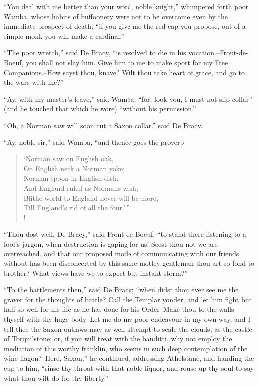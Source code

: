 ``You deal with me better than your word, noble knight,'' whimpered
forth poor Wamba, whose habits of buffoonery were not to be overcome
even by the immediate prospect of death; ``if you give me the red cap
you propose, out of a simple monk you will make a cardinal.''

``The poor wretch,'' said De Bracy, ``is resolved to die in his
vocation.--Front-de-Boeuf, you shall not slay him. Give him to me to
make sport for my Free Companions.--How sayst thou, knave? Wilt thou
take heart of grace, and go to the wars with me?''

``Ay, with my master's leave,'' said Wamba; ``for, look you, I must not
slip collar'' (and he touched that which he wore) ``without his
permission.''

``Oh, a Norman saw will soon cut a Saxon collar.'' said De Bracy.

``Ay, noble sir,'' said Wamba, ``and thence goes the proverb--

\begin{verse}
`Norman saw on English oak,\\
On English neck a Norman yoke;\\
Norman spoon in English dish,\\
And England ruled as Normans wish;\\
Blithe world to England never will be more,\\
Till England's rid of all the four.'\,''\\!
\end{verse}

``Thou dost well, De Bracy,'' said Front-de-Boeuf, ``to stand there
listening to a fool's jargon, when destruction is gaping for us! Seest
thou not we are overreached, and that our proposed mode of communicating
with our friends without has been disconcerted by this same motley
gentleman thou art so fond to brother? What views have we to expect but
instant storm?''

``To the battlements then,'' said De Bracy; ``when didst thou ever see
me the graver for the thoughts of battle? Call the Templar yonder, and
let him fight but half so well for his life as he has done for his
Order--Make thou to the walls thyself with thy huge body--Let me do my
poor endeavour in my own way, and I tell thee the Saxon outlaws may as
well attempt to scale the clouds, as the castle of Torquilstone; or, if
you will treat with the banditti, why not employ the mediation of this
worthy franklin, who seems in such deep contemplation of the
wine-flagon?--Here, Saxon,'' he continued, addressing Athelstane, and
handing the cup to him, ``rinse thy throat with that noble liquor, and
rouse up thy soul to say what thou wilt do for thy liberty.''

